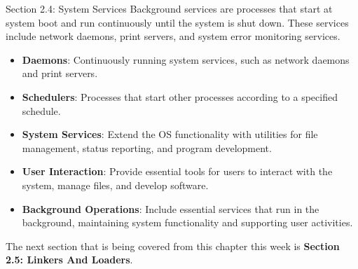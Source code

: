 \begin{notes}{Section 2.4: System Services}
    Background services are processes that start at system boot and run continuously until the system is shut down. These services include network daemons, print servers, and system error monitoring services.
    
    \begin{highlight}
    
    \begin{itemize}
        \item \textbf{Daemons}: Continuously running system services, such as network daemons and print servers.
        \item \textbf{Schedulers}: Processes that start other processes according to a specified schedule.
    \end{itemize}
    
    \end{highlight}
    
    \begin{highlight}
    
    \begin{itemize}
        \item \textbf{System Services}: Extend the OS functionality with utilities for file management, status reporting, and program development.
        \item \textbf{User Interaction}: Provide essential tools for users to interact with the system, manage files, and develop software.
        \item \textbf{Background Operations}: Include essential services that run in the background, maintaining system functionality and supporting user activities.
    \end{itemize}
    
    \end{highlight}
\end{notes}

The next section that is being covered from this chapter this week is \textbf{Section 2.5: Linkers And Loaders}.


